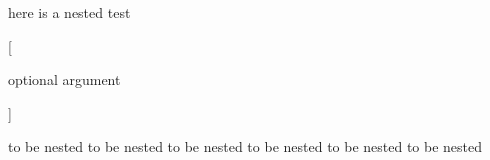 here is a nested test
\begin{one}


  [

  optional argument
  
  ]



	to be nested to be nested
	to be nested to be nested
	to be nested to be nested
\end{one}

